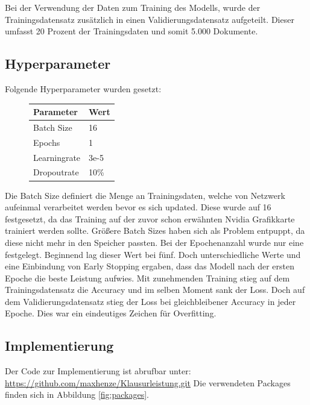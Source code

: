 \documentclass[DIV=13,fontsize=11pt]{scrartcl}
\begin{document}
Bei der Verwendung der Daten zum Training des Modells, wurde der Trainingsdatensatz zusätzlich in einen
Validierungsdatensatz aufgeteilt. Dieser umfasst 20 Prozent der Trainingsdaten und somit 5.000 Dokumente.

\subsection{Hyperparameter}

Folgende Hyperparameter wurden gesetzt:

\begin{figure}[H]
    \centering
    \begin{tabular}{ll}
        \toprule
        Parameter    & Wert \\
        \midrule
        Batch Size   & 16   \\
        Epochs       & 1    \\
        Learningrate & 3e-5 \\
        Dropoutrate  & 10\% \\
        \bottomrule
    \end{tabular}
\end{figure}

Die Batch Size definiert die Menge an Trainingsdaten, welche von Netzwerk aufeinmal
verarbeitet werden bevor es sich updated. Diese wurde auf 16 festgesetzt, da das
Training auf der zuvor schon erwähnten Nvidia Grafikkarte trainiert werden sollte.
Größere Batch Sizes haben sich als Problem entpuppt, da diese nicht mehr in den
Speicher passten.
Bei der Epochenanzahl wurde nur eine festgelegt.
Beginnend lag dieser Wert bei fünf. Doch unterschiedliche Werte und eine Einbindung
von Early Stopping ergaben, dass das Modell nach der ersten Epoche die
beste Leistung aufwies. Mit zunehmenden Training stieg auf dem Trainingsdatensatz
die Accuracy und im selben Moment sank der Loss. Doch auf dem Validierungsdatensatz
stieg der Loss bei gleichbleibener Accuracy in jeder Epoche. Dies war ein eindeutiges
Zeichen für Overfitting.

\subsection{Implementierung}

Der Code zur Implementierung ist abrufbar unter: \url{https://github.com/maxhenze/Klausurleistung.git}
Die verwendeten Packages finden sich in Abbildung \ref{fig:packages}.\\
\end{document}
